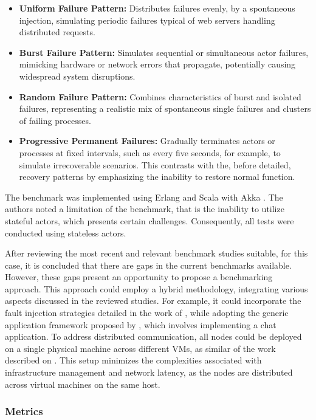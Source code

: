 \begin{itemize}
    \item \textbf{Uniform Failure Pattern:} Distributes failures evenly, by a spontaneous injection, simulating periodic failures typical of web servers handling distributed requests.
    \item \textbf{Burst Failure Pattern:} Simulates sequential or simultaneous actor failures, mimicking hardware or network errors that propagate, potentially causing widespread system disruptions.
    \item \textbf{Random Failure Pattern:} Combines characteristics of burst and isolated failures, representing a realistic mix of spontaneous single failures and clusters of failing processes.
    \item \textbf{Progressive Permanent Failures:} Gradually terminates actors or processes at fixed intervals, such as every five seconds, for example, to simulate irrecoverable scenarios. This contrasts with the, before detailed, recovery patterns by emphasizing the inability to restore normal function.
\end{itemize}

The benchmark was implemented using Erlang and Scala with Akka \cite{Randtoul2022}. The authors noted a limitation of the benchmark, that is the inability to utilize stateful actors, which presents certain challenges. Consequently, all tests were conducted using stateless actors.

After reviewing the most recent and relevant benchmark studies suitable, for this case, it is concluded that there are gaps in the current benchmarks available. However, these gaps present an opportunity to propose a benchmarking approach. This approach could employ a hybrid methodology, integrating various aspects discussed in the reviewed studies. For example, it could incorporate the fault injection strategies detailed in the work of \cite{Randtoul2022}, while adopting the generic application framework proposed by \cite{Blessing2019}, which involves implementing a chat application. To address distributed communication, all nodes could be deployed on a single physical machine across different \glspl{VM}, as similar of the work described on \cite{Randtoul2022}. This setup minimizes the complexities associated with infrastructure management and network latency, as the nodes are distributed across virtual machines on the same host.

\subsubsection{Metrics}

